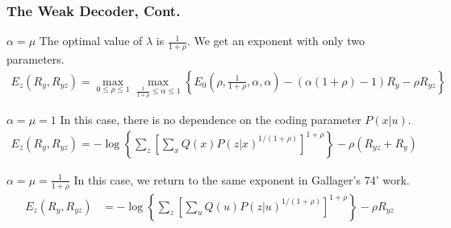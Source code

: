 \documentclass[mathserif]{beamer}
\begin{document}
\begin{frame}
\frametitle{The Weak Decoder, Cont.}
\begin{exampleblock}{\footnotesize $\alpha = \mu$}
\footnotesize The optimal value of $\lambda$ is $\frac 1 {1+\rho}$. We get an exponent with only two parameters.
\begin{align*}
     E_z(R_y,R_{yz})=\max_{0\le\rho\le 1}\max_{
    \frac 1 {1+\rho}\le\alpha\le 1}
    \left\{E_0(\rho,\frac 1 {1+\rho},\alpha,\alpha)-(\alpha(1+\rho)-1)R_y-\rho
    R_{yz}\right\}
\end{align*}
\end{exampleblock}
\pause
\begin{exampleblock}{\footnotesize $\alpha = \mu = 1$}
\footnotesize In this case, there is no dependence on the coding parameter $P(x|u)$.
\begin{align*}
    E_z(R_y,R_{yz})=-\log\left\{\sum_z\left[\sum_xQ(x)P(z|x)^{1/(1+\rho)}\right]^{1+\rho}\right\}-\rho(
    R_{yz}+R_y)
\end{align*}
\end{exampleblock}
\pause
\begin{exampleblock}{\footnotesize $\alpha = \mu = \frac 1 {1+\rho}$}
\footnotesize In this case, we return to the same exponent in Gallager's 74' work.
\begin{align*}
    E_z(R_y,R_{yz})&=-\log\left\{\sum_z\left[\sum_uQ(u)P(z|u)^{1/(1+\rho)}\right]^{1+\rho}\right\}-\rho
    R_{yz}
\end{align*}
\end{exampleblock}
\end{frame}
\end{document}
